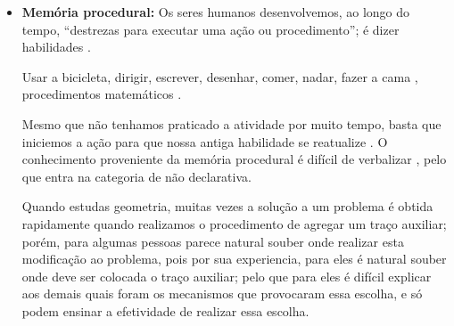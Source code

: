 \begin{itemize}
\item \textbf{Memória procedural:}
\label{reflab:memprocedural}
Os seres humanos desenvolvemos, ao longo do tempo, ``destrezas para executar uma ação ou procedimento'';
é dizer habilidades
\cite[pp. 140]{pake2019psicologia} \cite[pp. 36]{de2000comprension}.
\begin{example}
Usar a bicicleta, dirigir, escrever, desenhar, comer, nadar, fazer a cama \cite[pp. 36]{de2000comprension},
procedimentos matemáticos \cite{evans2016extension} \cite{davis2000memory}.
\end{example}
Mesmo que não tenhamos praticado a atividade por muito tempo, 
basta que iniciemos a ação para que nossa antiga habilidade se reatualize 
\cite[pp. 36]{de2000comprension}.
O conhecimento proveniente da memória procedural é difícil de verbalizar
\cite[pp. 36]{de2000comprension}, pelo que entra na categoria de não declarativa.
\begin{example}
Quando estudas geometria, 
muitas vezes a solução a um problema é obtida rapidamente quando realizamos o procedimento de agregar um traço auxiliar;
porém, para algumas pessoas parece natural souber onde realizar esta modificação ao problema,
pois por sua experiencia, para eles é natural souber onde deve ser colocada o traço auxiliar;
pelo que para eles é difícil explicar aos demais quais foram os mecanismos que provocaram essa escolha,
e só podem ensinar a efetividade de realizar essa escolha.


\end{example}
\end{itemize}
